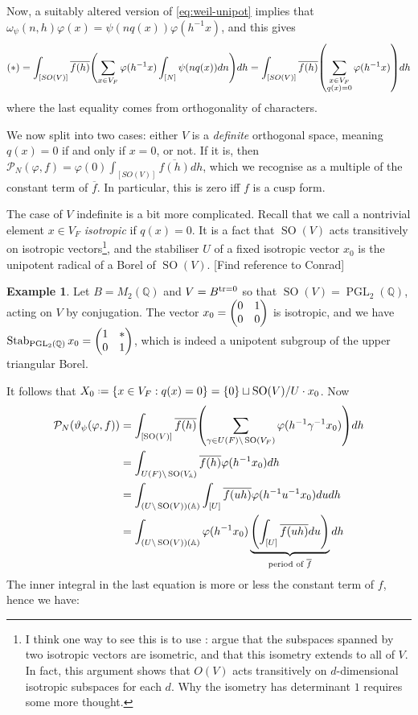 \documentclass[11pt,a4paper,leqno]{article}
\let\mc\mathcal
\newcommand{\A}{\mathbb{A}}
\newcommand{\1}{\mathbbm{1}}
\newcommand{\Q}{\mathbb{Q}}
\newcommand*{\defeq}{\mathrel{\vcenter{\baselineskip0.5ex \lineskiplimit0pt
      \hbox{\scriptsize.}\hbox{\scriptsize.}}}%
  =}
\renewcommand{\bar}{\overline}
\renewcommand{\phi}{\varphi}
\renewcommand{\theta}{\vartheta}
\DeclareMathOperator{\Stab}{Stab}
\DeclareMathOperator{\SO}{SO}
\DeclareMathOperator{\PGL}{PGL}
\theoremstyle{plain}
\theoremstyle{definition}
\newtheorem{example}[theorem]{Example}
\theoremstyle{remark}
\numberwithin{equation}{section}
\begin{document}
Now, a suitably altered version of \cref{eq:weil-unipot} implies that
$\omega_{\psi}(n,h)\phi (x) = \psi(n q(x))\phi(h^{-1}x)$, and this gives
\begin{equation}
  \label{eq:38}
(*) = \int_{[SO(V)]}\overline{f(h)}\qty(\sum_{x \in V_{F}}\phi(h^{-1}x)\int_{[N]}
\psi(n q(x))dn)dh = \int_{[SO(V)]} \overline{f(h)}\qty(\sum_{\substack{x \in
    V_{F} \\ q(x) = 0 }} \phi(h^{-1}x))dh
\end{equation}
where the last equality comes from orthogonality of characters.

We now split into two cases: either $V$ is a \emph{definite}
orthogonal space, meaning $q(x) = 0$ if and only if $x = 0$, or not.
If it is, then $\mc P_{N}(\phi,f) = \phi(0) \int_{[SO(V)]}\overline{f(h)}dh$,
which we recognise as a multiple of the constant term of $\bar f$. In
particular, this is zero iff $f$ is a cusp form.

The case of $V$ indefinite is a bit more complicated. Recall that we
call a nontrivial element $x\in V_{F}$ \emph{isotropic} if $q(x) = 0$.
It is a fact that $\SO(V)$ acts transitively on isotropic
vectors\footnote{I think one way to see this is to use
  \cite[Thm.~42:17]{omeara1963}: argue that the subspaces spanned by two
  isotropic vectors are isometric, and that this isometry extends to
  all of $V$. In fact, this argument shows that $O(V)$ acts
  transitively on $d$-dimensional isotropic subspaces for each $d$.
  Why the isometry has determinant $1$ requires some more thought.},
and the stabiliser $U$ of a fixed isotropic vector $x_{0}$ is the 
unipotent radical of a Borel of $\SO(V)$. [Find reference to Conrad]
\begin{example}
  Let $B = M_{2}(\Q)$ and $V = B^{\tr = 0}$ so that $\SO(V) =
  \PGL_{2}(\Q)$, acting on $V$ by conjugation. The vector $x_{0} = \mqty(0  & 1
  \\ 0 & 0)$ is isotropic, and we have $\Stab_{\PGL_{2}(\Q)} x_{0} =
  \mqty(1  & * \\ 0 & 1)$, which is indeed a unipotent subgroup of the
  upper triangular Borel.
\end{example}
It follows that $X_{0} \defeq \{ x \in V_{F} : q(x) = 0 \} = \{0\} \sqcup
\SO(V)/ U \cdot x_{0}$. Now
\begin{subequations}
  \begin{align}
    \label{eq:39}
    \mc P_{N}(\theta_{\psi}(\phi,f))
    &= \int_{[\SO(V)]} \overline{f(h)}\qty(\sum_{\gamma \in U(F)\backslash
      \SO(V_{F})}\phi(h^{-1}\gamma^{-1}x_{0}))dh \\
    &= \int_{U(F)\backslash \SO(V_{\A})}\overline{f(h)}\phi(h^{-1}x_{0})dh \\
    &= \int_{(U\backslash\SO(V))(\A)}\int_{[U]}\overline{f(uh)}\phi(h^{-1}u^{-1}x_{0})dudh \\
    &= \int_{(U\backslash\SO(V))(\A)}\phi(h^{-1}x_{0})\underbrace{\qty(\int_{[U]}
      \overline{f(uh)}du)}_{\text{period of $\bar f$}}dh
  \end{align}
\end{subequations}
The inner integral in the last equation is more or less the constant
term of $f$, hence we have:
\end{document}
